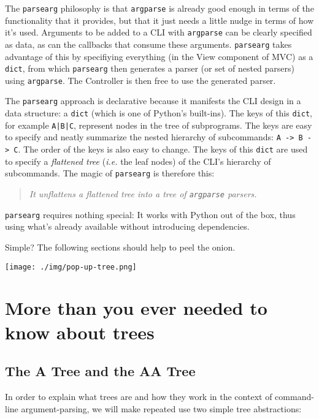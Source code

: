 \documentclass[10pt]{amsart}
\numberwithin{equation}{section}
\begin{document}
The \texttt{parsearg} philosophy is that \texttt{argparse} is already good enough in terms
of the functionality that it provides, but that it just needs a little nudge
in terms of how it's used.  Arguments to be added to a CLI with \texttt{argparse}
can be clearly specified as data, as can the callbacks that
consume these arguments. \texttt{parsearg} takes advantage of this by specifiying
everything (in the View component of MVC) as a \texttt{dict}, from which \texttt{parsearg}
then generates a parser (or set of nested parsers) using \texttt{argparse}. 
The Controller is then free to use the generated parser.

The \texttt{parsearg} approach is declarative because it manifests the CLI design
in a data structure: a \texttt{dict} (which is one of Python's built-ins).
The keys of this \texttt{dict}, for example \texttt{A|B|C}, represent nodes in the tree
of subprograms. The keys are easy to specify and neatly summarize the nested
hierarchy of subcommands: \texttt{A -> B -> C}. The order of the keys is also easy to change. 
The keys of this \texttt{dict} are used to specify a \emph{flattened tree} (\emph{i.e.} the leaf nodes)
of the CLI's hierarchy of subcommands. 
The magic of \texttt{parsearg} is therefore this:

\begin{quote}
\emph{It unflattens a flattened tree into a tree of \texttt{argparse} parsers.}
\end{quote}

\texttt{parsearg} requires nothing special: It works with Python out of the box, thus using
what's already available without introducing dependencies.

Simple? The following sections should help to peel the onion.

\begin{center}
\texttt{[image: ./img/pop-up-tree.png]}
\end{center}

\newpage
\section{More than you ever needed to know about trees}
\label{sec:orge309eba}
\subsection{The A Tree and the AA Tree}
\label{sec:org61e1325}
In order to explain what trees are and how they work in the context of
command-line argument-parsing, we will make repeated use two simple tree abstractions:
\end{document}
